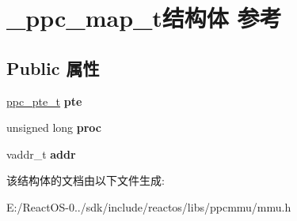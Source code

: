 \hypertarget{struct__ppc__map__t}{}\section{\+\_\+ppc\+\_\+map\+\_\+t结构体 参考}
\label{struct__ppc__map__t}
\subsection*{Public 属性}
\begin{DoxyCompactItemize}
\item 
\mbox{\label{struct__ppc__map__t_a3f2973f516cb9d2f817494fa696b3334}} 
\hyperlink{struct__ppc__pte__t}{ppc\+\_\+pte\+\_\+t} {\bfseries pte}
\item 
\mbox{\label{struct__ppc__map__t_ae2ee9bff99e1faf99092ca7e7b303f68}} 
unsigned long {\bfseries proc}
\item 
\mbox{\label{struct__ppc__map__t_a5219585de4fd3068df6035758cf8335f}} 
vaddr\+\_\+t {\bfseries addr}
\end{DoxyCompactItemize}


该结构体的文档由以下文件生成\+:\begin{DoxyCompactItemize}
\item 
E\+:/\+React\+O\+S-\/0../sdk/include/reactos/libs/ppcmmu/mmu.\+h\end{DoxyCompactItemize}
